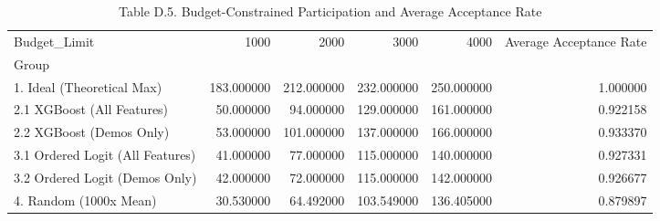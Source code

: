 \begin{table}
\caption{Table D.5. Budget-Constrained Participation and Average Acceptance Rate}
\begin{tabular}{lrrrrr}
\toprule
Budget_Limit & 1000 & 2000 & 3000 & 4000 & Average Acceptance Rate \\
Group &  &  &  &  &  \\
\midrule
1. Ideal (Theoretical Max) & 183.000000 & 212.000000 & 232.000000 & 250.000000 & 1.000000 \\
2.1 XGBoost (All Features) & 50.000000 & 94.000000 & 129.000000 & 161.000000 & 0.922158 \\
2.2 XGBoost (Demos Only) & 53.000000 & 101.000000 & 137.000000 & 166.000000 & 0.933370 \\
3.1 Ordered Logit (All Features) & 41.000000 & 77.000000 & 115.000000 & 140.000000 & 0.927331 \\
3.2 Ordered Logit (Demos Only) & 42.000000 & 72.000000 & 115.000000 & 142.000000 & 0.926677 \\
4. Random (1000x Mean) & 30.530000 & 64.492000 & 103.549000 & 136.405000 & 0.879897 \\
\bottomrule
\end{tabular}
\end{table}
